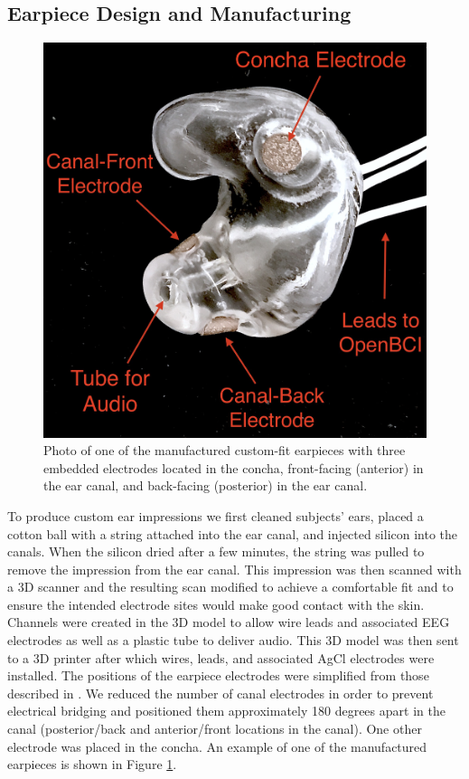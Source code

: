 \documentclass[a4paper,twoside]{article}
\begin{document}
\subsection{Earpiece Design and Manufacturing}

\begin{figure}
\centering
\includegraphics[width=.75\linewidth]{./figures/CFEEEG_piecefig_Right.jpg}
\caption{Photo of one of the manufactured custom-fit earpieces with three embedded electrodes located in the concha, front-facing (anterior) in the ear canal, and back-facing (posterior) in the ear canal.}
\label{fig:earpiece_diagram}
\end{figure}

To produce custom ear impressions we first cleaned subjects' ears, placed a cotton ball with a string attached into the ear canal, and injected silicon into the canals. When the silicon dried after a few minutes, the string was pulled to remove the impression from the ear canal. This impression was then scanned with a 3D scanner and the resulting scan modified to achieve a comfortable fit and to ensure the intended electrode sites would make good contact with the skin. Channels were created in the 3D model to allow wire leads and associated EEG electrodes as well as a plastic tube to deliver audio. This 3D model was then sent to a 3D printer after which wires, leads, and associated AgCl electrodes were installed. The positions of the earpiece electrodes were simplified from those described in \cite{Mikkelsen2015}. We reduced the number of canal electrodes in order to prevent electrical bridging and positioned them approximately 180 degrees apart in the canal (posterior/back and anterior/front locations in the canal). One other electrode was placed in the concha. An example of one of the manufactured earpieces is shown in Figure \ref{fig:earpiece_diagram}.
\end{document}

